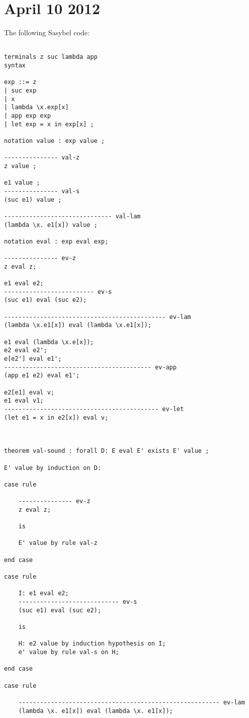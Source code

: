 \documentclass[12pt]{article}
\begin{document}
\section{April 10 2012}
The following \textmd{Sasybel} code:
\footnotesize\begin{verbatim}

terminals z suc lambda app
syntax

exp ::= z
| suc exp
| x
| lambda \x.exp[x]
| app exp exp
| let exp = x in exp[x] ;

notation value : exp value ;

--------------- val-z
z value ;

e1 value ;
--------------- val-s
(suc e1) value ;

------------------------------ val-lam
(lambda \x. e1[x]) value ;

notation eval : exp eval exp;

--------------- ev-z
z eval z;

e1 eval e2;
------------------------- ev-s
(suc e1) eval (suc e2);

--------------------------------------------- ev-lam
(lambda \x.e1[x]) eval (lambda \x.e1[x]);

e1 eval (lambda \x.e[x]);
e2 eval e2';
e[e2'] eval e1';
----------------------------------------- ev-app
(app e1 e2) eval e1';

e2[e1] eval v;
e1 eval v1;
------------------------------------------- ev-let
(let e1 = x in e2[x]) eval v;



theorem val-sound : forall D: E eval E' exists E' value ;

E' value by induction on D:

case rule

	--------------- ev-z
	z eval z;

	is

	E' value by rule val-z

end case

case rule

	I: e1 eval e2;
	---------------------------- ev-s
	(suc e1) eval (suc e2);

	is

	H: e2 value by induction hypothesis on I;
	e' value by rule val-s on H;

end case

case rule

	-------------------------------------------------------- ev-lam
	(lambda \x. e1[x]) eval (lambda \x. e1[x]);


\end{verbatim}
\end{document}
